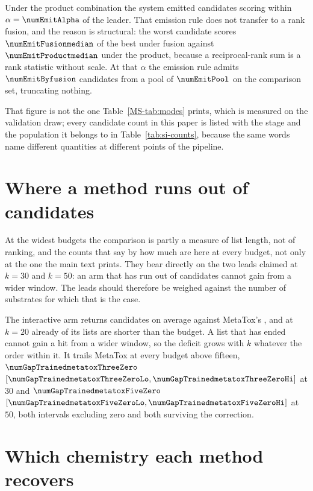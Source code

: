 \documentclass[journal=jcisd8,manuscript=suppinfo,layout=onecolumn]{achemso}
\begin{document}
Under the product combination the system emitted candidates scoring within $\alpha =
\numEmitAlpha$ of the leader. That emission rule does not transfer to a rank fusion, and the reason
is
structural: the worst candidate scores $\numEmitFusionmedian$ of the best under fusion against
$\numEmitProductmedian$ under the product, because a reciprocal-rank sum is a rank statistic
without scale. At that $\alpha$ the emission rule admits $\numEmitByfusion$ candidates from a pool
of
$\numEmitPool$ on the comparison set, truncating nothing.

That figure is not the one Table~\ref{MS-tab:modes} prints, which is
measured on the validation draw; every candidate count in this paper is listed with the stage and
the population it belongs to in Table~\ref{tab:si-counts}, because the same words name
different quantities at different points of the pipeline.
\section{Where a method runs out of candidates}
\label{sec:si-short}



At the widest budgets the comparison is partly a measure of list length, not of ranking, and the
counts that say by how much are here at every budget, not only at the one the main text
prints. They bear directly on the two leads claimed at $k=30$ and $k=50$: an arm that has run out
of candidates cannot gain from a wider window. The leads should therefore be weighed against the
number of substrates for which that is the case.


The interactive arm returns \numEmittedTrained{} candidates on average against MetaTox's
\numEmittedMetatox{}, and at $k=20$ already \numShortTrainedTwoZero{} of its \numPopulationN{}
lists are shorter than the budget. A list that has ended cannot gain a hit from a wider window, so
the deficit grows with $k$ whatever the order within it. It trails MetaTox at every budget above
fifteen, $\numGapTrainedmetatoxThreeZero$ $[\numGapTrainedmetatoxThreeZeroLo,
\numGapTrainedmetatoxThreeZeroHi]$ at $30$ and $\numGapTrainedmetatoxFiveZero$
$[\numGapTrainedmetatoxFiveZeroLo, \numGapTrainedmetatoxFiveZeroHi]$ at $50$, both intervals
excluding zero and both surviving the correction.
\section{Which chemistry each method recovers}
\label{sec:si-chemistry}
\end{document}
